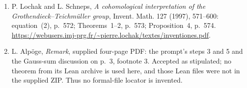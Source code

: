 \documentclass[11pt]{article}
\begin{document}
\begin{enumerate}
equation~(1), author PDF p.~3; Section~1.1, p.~9;
Section~3, Lemma~1, p.~30.
\url{https://webusers.imj-prg.fr/~leila.schneps/HS.pdf}.
\item P. Lochak and L. Schneps, \emph{A cohomological interpretation
of the Grothendieck--Teichm\"uller group}, Invent. Math. 127
(1997), 571--600: equation~(2), p.~572; Theorems~1--2,
p.~573; Proposition~4, p.~574.
\url{https://webusers.imj-prg.fr/~pierre.lochak/textes/inventiones.pdf}.
\item L. Alp\"oge, \emph{Remark}, supplied four-page PDF:
the prompt's steps 3 and 5 and the Gauss-sum discussion on
p.~3, footnote 3.  Accepted as stipulated; no theorem from
its Lean archive is used here, and those Lean files were not
in the supplied ZIP.  Thus no formal-file locator is invented.
\end{enumerate}
\end{document}
